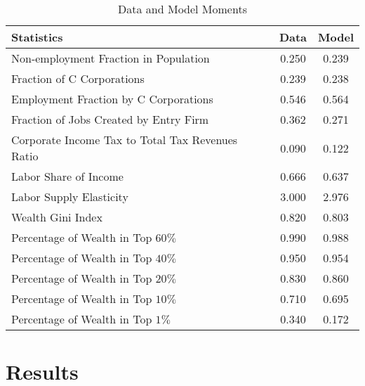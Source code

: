 \documentclass[12pt]{article}
\begin{document}
\begin{table}[!ht]
\caption{\sc Data and Model Moments}
\label{tab_moment}
\begin{center}
\begin{tabular}{lcc}
\hline\hline
Statistics &       Data &      Model \\
\hline
Non-employment Fraction in Population &      0.250 &      0.239 \\

Fraction of C Corporations &      0.239 &      0.238 \\

Employment Fraction by C Corporations &      0.546 &      0.564 \\

Fraction of Jobs Created by Entry Firm &      0.362 &      0.271 \\

Corporate Income Tax to Total Tax Revenues Ratio &      0.090 &      0.122 \\

Labor Share of Income &      0.666 &      0.637 \\

Labor Supply Elasticity &      3.000 &      2.976 \\

Wealth Gini Index &      0.820 &      0.803 \\

Percentage of Wealth in Top $60\%$ &      0.990 &      0.988 \\

Percentage of Wealth in Top $40\%$ &      0.950 &      0.954 \\

Percentage of Wealth in Top $20\%$  &      0.830 &       0.860 \\

Percentage of Wealth in Top $10\%$ &      0.710 &      0.695 \\

Percentage of Wealth in Top $1\%$ &      0.340 &      0.172 \\

\hline\hline
\end{tabular}  
\end{center}
\end{table}

\section{Results}
\end{document}
